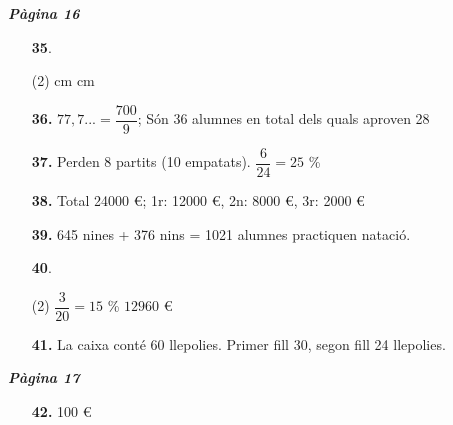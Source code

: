 \documentclass[a4paper, pdf, twoside]{book}
\begin{document}
\begin{multicols}{2}
{\textbf{\em Pàgina 16}} \hrulefill
\begin{enumerate}
\vspace{0.25cm}



 \item[\fontfamily{phv}\selectfont\color{blue}\textbf{35}. ] 
 \begin{tasks}[column-sep=1em, item-indent=1.3333em](2)
	  cm
	  cm
\end{tasks}
 \end{enumerate}
\begin{enumerate}
\vspace{0.25cm}
\item[\fontfamily{phv}\selectfont\color{blue}\textbf{36. }] 
$77,7...= \dfrac {700}{9}$; Són 36 alumnes en total dels quals aproven 28
\vspace{0.25cm}
\item[\fontfamily{phv}\selectfont\color{blue}\textbf{37. }] 
Perden 8 partits (10 empatats). $\dfrac {6}{24}=25$ \%
\vspace{0.25cm}
\item[\fontfamily{phv}\selectfont\color{blue}\textbf{38. }] 
Total 24000 \euro {}; 1r: 12000 \euro {}, 2n: 8000 \euro {}, 3r: 2000 \euro {} 
\vspace{0.25cm}
\item[\fontfamily{phv}\selectfont\color{blue}\textbf{39. }] 
645 nines + 376 nins = 1021 alumnes practiquen natació.
\vspace{0.25cm}



 \item[\fontfamily{phv}\selectfont\color{blue}\textbf{40}. ] 
 \begin{tasks}[column-sep=1em, item-indent=1.3333em](2)
	 \task $\dfrac {3}{20}=15$ \%
	 \task $12960$ \euro {}
\end{tasks}
\vspace{0.25cm}
\item[\fontfamily{phv}\selectfont\color{blue}\textbf{41. }] 
La caixa conté 60 llepolies. Primer fill 30, segon fill 24 llepolies.
 \end{enumerate}
\vspace{0.3cm}


{\textbf{\em Pàgina 17}} \hrulefill
\begin{enumerate}
\vspace{0.25cm}
\item[\fontfamily{phv}\selectfont\color{blue}\textbf{42. }] 
100 \euro {}
 \end{enumerate}
\begin{enumerate}
\vspace{0.25cm}



\end{enumerate}
\end{multicols}
\end{document}
